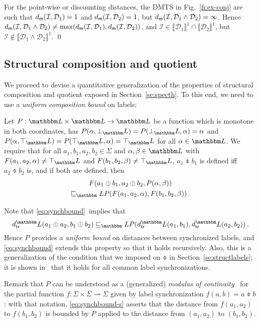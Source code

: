 \documentclass[twocolumn]{svjour3-dummy}
\newcommand*\parto{\rightharpoonup}
\newcommand*\cI{\mathcal I}
\newcommand*\cD{\mathcal D}
\newcommand*\sem[1]{\llbracket #1\rrbracket}
\newcommand*\LL{\mathbbm L}
\newcommand*\md{d_\textup{\textsf{m}}} \newcommand*\mdl{\smash{\md^\LL}}
\begin{document}
\begin{example}
  \label{ex:no-qconj}
  For the point-wise or discounting distances, the DMTS in
  Fig.~\ref{fi:ex-conj} are such that $\md( \cI, \cD_1)= 1$ and $\md(
  \cI, \cD_2)= 1$, but $\md( \cI, \cD_1\land \cD_2)= \infty$.  Hence
  $\md( \cI, \cD_1\land \cD_2)\ne \max( \md( \cI, \cD_1), \md( \cI,
  \cD_2))$, and $\cI\in \sem{ \cD_1}^1\cap \sem{ \cD_2}^1$, but
  $\cI\notin \sem{ \cD_1\land \cD_2}^1$. \qed
\end{example}

\subsection{Structural composition and quotient}

We proceed to devise a quantitative generalization of the properties of
structural composition and quotient exposed in Section~\ref{se:specth}.
To this end, we need to use a \emph{uniform composition bound} on
labels:

Let $P: \LL\times \LL\to \LL$ be a function which is monotone in both
coordinates, has $P( \alpha, \bot_\LL)= P( \bot_\LL, \alpha)= \alpha$
and $P( \alpha, \top_\LL)= P( \top_\LL, \alpha)= \top_\LL$ for all
$\alpha\in \LL$.  We require that for all $a_1, b_1, a_2, b_2\in
\Sigma$ and $\alpha, \beta\in \LL$ with $F( a_1, a_2, \alpha)\ne
\top_\LL$ and $F( b_1, b_2, \beta)\ne \top_\LL$, $a_1\obar b_1$ is
defined iff $a_2\obar b_2$ is, and if both are defined, then
\begin{multline}
  \label{eq:synchbound}
  F( a_1\obar b_1, a_2\obar b_2, P( \alpha, \beta)) \\
  \sqsubseteq_\LL P( F( a_1, a_2, \alpha), F( b_1, b_2, \beta))\,.
\end{multline}

Note that \eqref{eq:synchbound}~implies that
\begin{equation}
  \label{eq:synchbound-s}
  \tdl( a_1\obar a_2,
  b_1\obar b_2)\sqsubseteq_\LL P( \tdl( a_1, b_1), \tdl( a_2, b_2))\,.
\end{equation}
Hence $P$ provides a \emph{uniform bound} on distances between
synchronized labels, and \eqref{eq:synchbound} extends this property
so that it holds recursively.  Also, this is a generalization of the
condition that we imposed on $\obar$ in Section~\ref{se:structlabels};
it is shown in~\cite[p.~18]{DBLP:journals/acta/FahrenbergL14} that it
holds for all common label synchronizations.

Remark that $P$ can be understood as a (generalized) \emph{modulus of
  continuity}~\cite{encmath/continuity} for the partial function $f:
\Sigma\times \Sigma\parto \Sigma$ given by label synchronization $f(
a, b)= a\obar b$: with that notation, \eqref{eq:synchbound-s} asserts
that the distance from $f( a_1, a_2)$ to $f( b_1, b_2)$ is bounded by
$P$ applied to the distance from $( a_1, a_2)$ to $( b_1, b_2)$.
\end{document}
